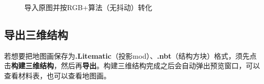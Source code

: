 \documentclass[UTF8]{ctexart}
\begin{document}
\begin{figure}[htbp]
    \centering
    \setcounter{subfigure}{0}
    \caption{导入原图并按RGB+算法（无抖动）转化}
\end{figure}

\subsection{导出三维结构}
若想要把地图画保存为\textbf{.Litematic}（投影mod）、\textbf{.nbt}（结构方块）格式，须先点击\textbf{构建三维结构}，然后再\textbf{导出}。构建三维结构完成之后会自动弹出预览窗口，可以查看材料表，也可以查看地图画。
\end{document}
